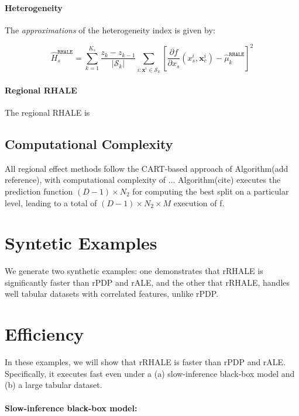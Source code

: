 \documentclass[
twocolumn,
]{ceurart}
\newcommand{\xb}{\mathbf{x}}
\newcommand{\xci}{\mathbf{x}^i_c}
\begin{document}
\paragraph{Heterogeneity}

The \textit{approximations} of the heterogeneity index is given by:

\begin{equation}
  \label{eq:rhale-approximation-heterogeneity}
  \hat{H}_s^{\mathtt{RHALE}} = \sum_{k=1}^{K_s} \frac{z_k - z_{k-1}}{|\mathcal{S}_k|}\sum_{i: \xb^i \in \mathcal{S}_k} \left [ \frac{\partial f}{\partial x_s} (x_s^i, \xci) - \hat{\mu}_k^{\mathtt{RHALE}} \right ]^2
\end{equation}

\paragraph{Regional RHALE}

The regional RHALE is 


\subsection{Computational Complexity}

All regional effect methods follow the CART-based approach of Algorithm(add reference), with computational complexity of ... Algorithm(cite) executes the prediction function $(D-1) \times N_2 $ for computing the best split on a particular level, leading to a total of $(D-1) \times N_2 \times M$ execution of f.

\clearpage
\section{Syntetic Examples}

We generate two synthetic examples: one demonstrates that rRHALE is significantly faster than rPDP and rALE, and the other that rRHALE, handles well tabular datasets with correlated features, unlike rPDP.

\section{Efficiency}

In these examples, we will show that rRHALE is faster than rPDP and rALE. Specifically, it executes fast even under a (a) slow-inference black-box model and (b) a large tabular dataset.

\paragraph{Slow-inference black-box model:}
\end{document}
